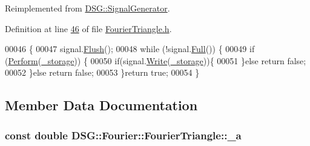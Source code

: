 Reimplemented from \hyperlink{class_d_s_g_1_1_signal_generator_ab050f80e84e6c8b3e354b56930d6a02b}{D\+S\+G\+::\+Signal\+Generator}.



Definition at line \hyperlink{_fourier_triangle_8h_source_l00046}{46} of file \hyperlink{_fourier_triangle_8h_source}{Fourier\+Triangle.\+h}.


\begin{DoxyCode}
00046                                                                            \{
00047             signal.\hyperlink{class_d_s_g_1_1_ring_buffer_ab23c8003d2857809a816068eeb209d60}{Flush}();
00048             \textcolor{keywordflow}{while} (!signal.\hyperlink{class_d_s_g_1_1_ring_buffer_a53ddb04ffcbb5470a8d2b0a3c65b70cb}{Full}()) \{
00049                 \textcolor{keywordflow}{if} (\hyperlink{class_d_s_g_1_1_fourier_1_1_fourier_triangle_ab5b947c1fc1f34a461c863b18e3e877d}{Perform}(\hyperlink{class_d_s_g_1_1_signal_generator_a28a9b47a1aa0783029f11a19ba0363f2}{\_storage})) \{
00050                     \textcolor{keywordflow}{if}(signal.\hyperlink{class_d_s_g_1_1_ring_buffer_aa5dd2caa0a270173251faee40a43d692}{Write}(\hyperlink{class_d_s_g_1_1_signal_generator_a28a9b47a1aa0783029f11a19ba0363f2}{\_storage}))\{
00051                     \}\textcolor{keywordflow}{else} \textcolor{keywordflow}{return} \textcolor{keyword}{false};
00052                 \}\textcolor{keywordflow}{else} \textcolor{keywordflow}{return} \textcolor{keyword}{false};
00053             \}\textcolor{keywordflow}{return} \textcolor{keyword}{true};
00054         \}
\end{DoxyCode}


\subsection{Member Data Documentation}
\hypertarget{class_d_s_g_1_1_fourier_1_1_fourier_triangle_a64263fc3fa98179d57d34a3f105d8c97}{
\subsubsection[{\+\_\+a}]{\setlength{\rightskip}{0pt plus 5cm}const double D\+S\+G\+::\+Fourier\+::\+Fourier\+Triangle\+::\+\_\+a\hspace{0.3cm}{\ttfamily [protected]}}}\label{class_d_s_g_1_1_fourier_1_1_fourier_triangle_a64263fc3fa98179d57d34a3f105d8c97}


